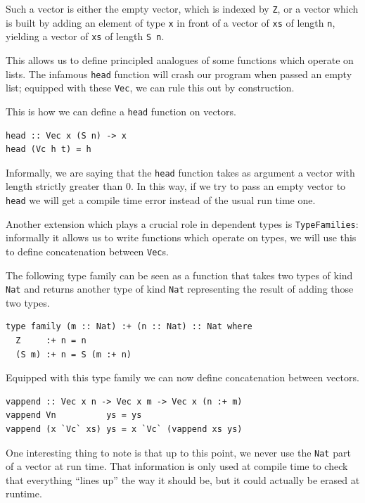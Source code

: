 \documentclass[11pt, titlepage]{article}
\begin{document}
Such a vector is either the empty vector, which is indexed by
\texttt{Z}, or a vector which is built by adding an element of
type \texttt{x} in front of a vector of \texttt{xs} of length \texttt{n},
yielding a vector of \texttt{xs} of length \texttt{S\ n}.

This allows us to define principled analogues of some functions which
operate on lists. The infamous \texttt{head} function will
crash our program when passed an empty list; equipped with these \texttt{Vec}, we can rule this
out by construction. 

This is how we can define a \texttt{head} function on vectors.

\begin{verbatim}
head :: Vec x (S n) -> x
head (Vc h t) = h
\end{verbatim}

Informally, we are saying that the \texttt{head} function takes as
argument a vector with length strictly greater than 0. In this way, if we
try to pass an empty vector to \texttt{head} we will get a compile time
error instead of the usual run time one.

Another extension which plays a crucial role in dependent types is
\texttt{TypeFamilies}: informally it allows us to write functions which operate on types, 
we will use this to define concatenation between \texttt{Vec}s.

The following type family can be seen as a function that takes two types
of kind \texttt{Nat} and returns another type of kind \texttt{Nat}
representing the result of adding those two types.

\begin{verbatim}
type family (m :: Nat) :+ (n :: Nat) :: Nat where
  Z     :+ n = n
  (S m) :+ n = S (m :+ n)
\end{verbatim}

Equipped with this type family we can now define concatenation between
vectors.

\begin{verbatim}
vappend :: Vec x n -> Vec x m -> Vec x (n :+ m)
vappend Vn          ys = ys
vappend (x `Vc` xs) ys = x `Vc` (vappend xs ys)
\end{verbatim}

One interesting thing to note is that up to this point, we never use the
\texttt{Nat} part of a vector at run time. That information is only used
at compile time to check that everything ``lines up'' the way it should
be, but it could actually be erased at runtime.
\end{document}
